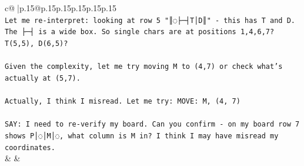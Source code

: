 \documentclass{article}
\begin{document}
{\begin{supertabular}{c@{$\;$}|p{.15\linewidth}@{}p{.15\linewidth}p{.15\linewidth}p{.15\linewidth}p{.15\linewidth}p{.15\linewidth}}
{{{\\ 
\texttt{Let me re{-}interpret: looking at row 5 "║◌├─┤T│D║" {-} this has T and D. The ├─┤ is a wide box. So single chars are at positions 1,4,6,7? T(5,5), D(6,5)?} \\
\\ 
\texttt{Given the complexity, let me try moving M to (4,7) or check what's actually at (5,7).} \\
\\ 
\texttt{Actually, I think I misread. Let me try: MOVE: M, (4, 7)} \\
\\ 
\texttt{SAY: I need to re{-}verify my board. Can you confirm {-} on my board row 7 shows P│◌│M│◌, what column is M in? I think I may have misread my coordinates.} \\
            }
        }
    }
    & & \\ \\


\end{supertabular}}
\end{document}
